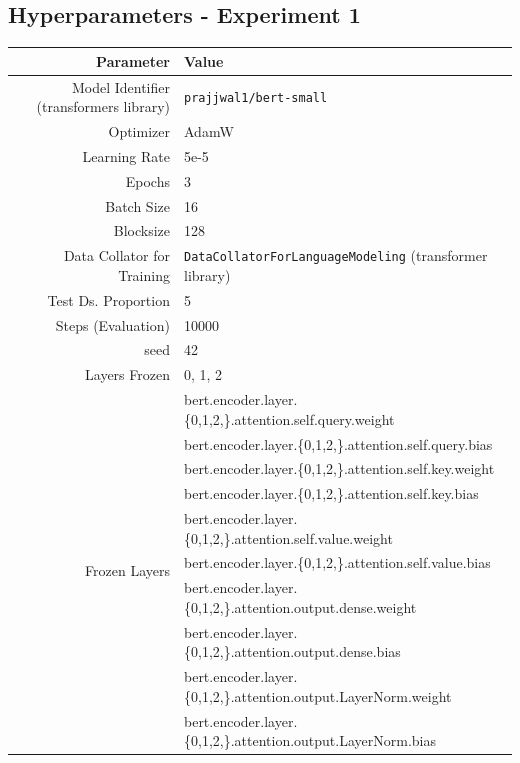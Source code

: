 \documentclass{article}
\begin{document}
\subsection{Hyperparameters - Experiment 1}
\begin{table}[!h]
    \centering
    \begin{tabular}{r|l}
        Parameter & Value \\ \hline
        Model Identifier (transformers library) & \texttt{prajjwal1/bert-small} \\
        Optimizer & AdamW \\
        Learning Rate & 5e-5 \\
        Epochs & 3 \\
        Batch Size & 16 \\
        Blocksize & 128 \\
        Data Collator for Training & \texttt{DataCollatorForLanguageModeling} (transformer library) \\
        Test Ds. Proportion & 5 \\
        Steps (Evaluation) & 10000 \\
        seed & 42 \\
        Layers Frozen & 0, 1, 2 \\
         \multirow{16}{*}{Frozen Layers} &     bert.encoder.layer.\{0,1,2,\}.attention.self.query.weight \\
                      &      bert.encoder.layer.\{0,1,2,\}.attention.self.query.bias \\
                      &      bert.encoder.layer.\{0,1,2,\}.attention.self.key.weight \\
                      &      bert.encoder.layer.\{0,1,2,\}.attention.self.key.bias \\
                      &      bert.encoder.layer.\{0,1,2,\}.attention.self.value.weight \\
                      &      bert.encoder.layer.\{0,1,2,\}.attention.self.value.bias \\
                      &      bert.encoder.layer.\{0,1,2,\}.attention.output.dense.weight \\
                      &      bert.encoder.layer.\{0,1,2,\}.attention.output.dense.bias \\
                      &      bert.encoder.layer.\{0,1,2,\}.attention.output.LayerNorm.weight \\
                      &      bert.encoder.layer.\{0,1,2,\}.attention.output.LayerNorm.bias \\

\end{tabular}
\end{table}
\end{document}
